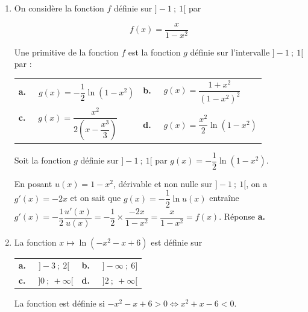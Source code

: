 \documentclass[10pt]{article}
\providecommand{\R}{\mathbb{R}}
\begin{document}
\begin{enumerate}
Sur $\R_{+}$, $g$ est dérivable et sur cet intervalle, $f'(x) = \ln (x) + x \times \dfrac{1}{x} - 2x = \ln (x) - 2x + 1$.

Puis $f''(x) = \dfrac{1}{x} - 2$.

On a donc $f''(x) = 0 \iff \dfrac{1}{x} - 2 = 0 \iff \dfrac{1}{x} = 2 \iff x = \dfrac{1}{2}$.

Sur $]0~;~+ \infty[$, \: $f$ a un seul point d'inflexion d'abscisse $\dfrac{1}{2}$. Réponse \textbf{c.}

\item On considère la fonction $f$ définie sur $]- 1~;~1[$ par

\[f(x) = \dfrac{x}{1 - x^2}\]

Une primitive de la fonction $f$ est la fonction $g$ définie sur l'intervalle $] - 1~;~1[$ par :

\begin{center}
\begin{tabularx}{\linewidth}{*{2}{X}}
\textbf{a.~~} $g(x) = - \dfrac12 \ln \left(1 - x^2\right)$&\textbf{b.~~} $g(x) =  \dfrac{1 + x^2}{ \left(1 - x^2\right)^2}$\\
\textbf{c.~~} $g(x)= \dfrac{x^2}{2\left(x - \dfrac{x^3}{3}\right)}$&\textbf{d.~~} $g(x) = \dfrac{x^2}{2}\ln \left(1 - x^2\right)$
\end{tabularx}
\end{center}

Soit la fonction $g$ définie sur $] - 1~;~1[$ par $g(x) = - \dfrac12 \ln \left(1 - x^2\right)$.

En posant $u(x) = 1 - x^2$, dérivable et non nulle sur $] - 1~;~1[$, on a $g'(x) = - 2x$ et on sait que $g(x) = - \dfrac12\ln u(x)$ entraîne $g'(x) = - \dfrac12\dfrac{u'(x)}{u(x)} = - \dfrac12 \times \dfrac{- 2x}{1 - x^2} = \dfrac{x}{1 - x^2} = f(x)$. Réponse \textbf{a.}
 
\item La  fonction $x \longmapsto  \ln \left(-x^2- x + 6\right)$ est définie sur

\begin{center}
\begin{tabularx}{\linewidth}{*{2}{X}}
\textbf{a.~~} $]- 3~;~2[$&\textbf{b.~~} $]- \infty~;~6]$\\
\textbf{c.~~} $]0~;~+\infty[$&\textbf{d.~~} $]2~;~+\infty[$
\end{tabularx}
\end{center}

La fonction est définie si $- x^2 - x + 6 > 0 \iff x^2 + x - 6 < 0$.


\end{enumerate}
\end{document}
